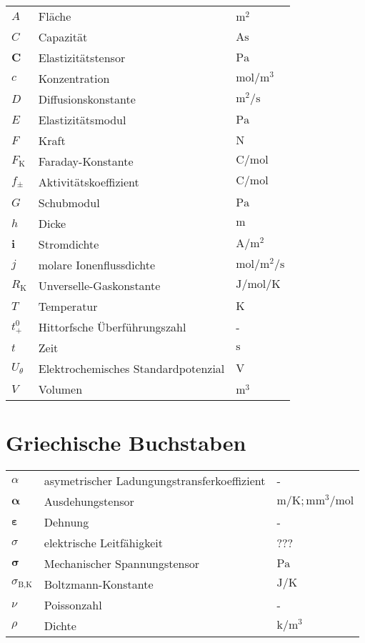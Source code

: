 {\begin{longtable}{@{}p{\TabulatorVZ}@{}p{\TabulatorTX}p{\TabulatorEH}@{}}
	$A$					& Fläche					&$\si{\metre\squared}$\\
	$C$					& Capazität					&$\si{\ampere\s}$\\
	$\boldsymbol{C}$	& Elastizitätstensor		&$\si{\pascal}$\\
	$c$					& Konzentration				&$\si{\mole\per\metre\cubed}$\\
	$D$					& Diffusionskonstante		&$\si{\metre\squared\per\second}$\\
	$E$					& Elastizitätsmodul			&$\si{\pascal}$\\
	$F$					& Kraft						&$\si{\newton}$\\
	$F_{\text{K}}$		& Faraday-Konstante			&$\si{\coulomb\per\mole}$\\
	$f_{\pm}$			& Aktivitätskoeffizient		&$\si{\coulomb\per\mole}$\\
	$G$					& Schubmodul				&$\si{\pascal}$\\
	$h$					& Dicke						&$\si{\metre}$\\
	$\boldsymbol{i}$	& Stromdichte				&$\si{\ampere\per\metre\squared}$\\
	$j$					& molare Ionenflussdichte	&$\si{\mole\per\metre\squared\per\second}$\\
	$R_{\text{K}}$		& Unverselle-Gaskonstante	&$\si{\joule\per\mole\per\kelvin}$\\
	$T$					& Temperatur				&$\si{\kelvin}$\\
	$t^0_+$				& Hittorfsche Überführungszahl & - \\
	$t$					& Zeit						&$\si{\second}$\\
	$U_{\theta}$ 		& Elektrochemisches Standardpotenzial	& $\si{\volt}$\\
	$V$					& Volumen					&$\si{\cubic\metre}$
\end{longtable}

\section*{Griechische Buchstaben}
\begin{longtable}{@{}p{\TabulatorVZ}@{}p{\TabulatorTX}p{\TabulatorEH}@{}}
	$\alpha$				& asymetrischer Ladungungstransferkoeffizient & - \\
	$\boldsymbol{\alpha}$   & Ausdehungstensor				& $\si{\metre\per\kelvin}; \si{\metre\metre\cubed\per\mol}$\\
	$\boldsymbol{\varepsilon}$ & Dehnung						& -	\\
	$\sigma$				& elektrische Leitfähigkeit		& ??? \\
	$\boldsymbol{\sigma}$	& Mechanischer Spannungstensor	& $\si{\pascal}$ \\
	$\sigma_{\text{B,K}}$	& Boltzmann-Konstante 			& $\si{\joule\per\kelvin}$ \\
	$\nu$					& Poissonzahl					& -	\\
	$\rho$					& Dichte						& $\si{\kilo\per\metre\cubed}$
\end{longtable}

}
